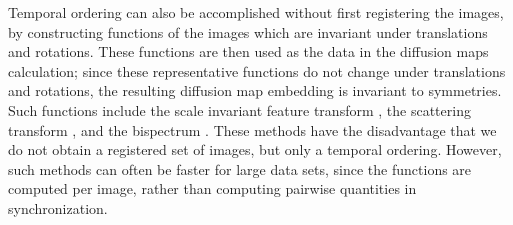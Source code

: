 \documentclass{pnastwo}
\begin{document}
\begin{article}
Temporal ordering can also be accomplished without first registering the images, by constructing functions of the images which are invariant under translations and rotations. 
%
These functions are then used as the data in the diffusion maps calculation; since these representative functions do not change under translations and rotations, the resulting diffusion map embedding is invariant to symmetries.
%
Such functions include the scale invariant feature transform \cite{lowe1999object, lowe2004distinctive}, the scattering transform \cite{mallat2012group}, and the bispectrum \cite{zhao2014rotationally}.
%
These methods have the disadvantage that we do not obtain a registered set of images, but only a temporal ordering.
%
However, such methods can often be faster for large data sets, since the functions are computed per image, rather than computing pairwise quantities in synchronization.


\end{article}
\end{document}
